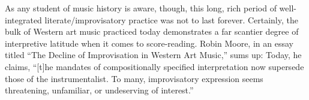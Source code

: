         
    

    As any student of music history is aware, though, this long, rich period of well-integrated literate/improvisatory practice was not to last forever. Certainly, the bulk of Western art music practiced today demonstrates a far scantier degree of interpretive latitude when it comes to score-reading. Robin Moore, in an essay titled ``The Decline of Improvisation in Western Art Music,'' sums up: Today, he claims, ``[t]he mandates of compositionally specified interpretation now supersede those of the instrumentalist. To many, improvisatory expression seems threatening, unfamiliar, or undeserving of interest.''\autocite[63]{Moore_1992} 
    
